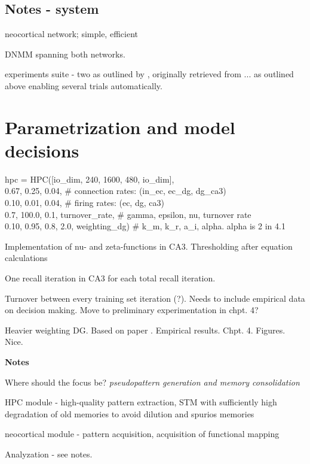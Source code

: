 \subsection*{Notes - system}

neocortical network; simple, efficient

DNMM spanning both networks.

experiments suite - two as outlined by \citep{Hattori2014}, originally retrieved from ... as outlined above
enabling several trials automatically.


\section{Parametrization and model decisions}

hpc = HPC([io\_dim, 240, 1600, 480, io\_dim], \\
          0.67, 0.25, 0.04,  \# connection rates: (in\_ec, ec\_dg, dg\_ca3) \\
          0.10, 0.01, 0.04,  \# firing rates: (ec, dg, ca3) \\
          0.7, 100.0, 0.1, turnover\_rate,  \# gamma, epsilon, nu, turnover rate \\
          0.10, 0.95, 0.8, 2.0, weighting\_dg)  \# k\_m, k\_r, a\_i, alpha. alpha is 2 in 4.1
          
Implementation of nu- and zeta-functions in CA3. Thresholding after equation calculations

One recall iteration in CA3 for each total recall iteration.

Turnover between every training set iteration (?). Needs to include empirical data on decision making. Move to preliminary experimentation in chpt. 4?

Heavier weighting DG. Based on paper \citep{Norman2003}. Empirical results. Chpt. 4. Figures. Nice.


\textbf{Notes}

Where should the focus be? \textit{pseudopattern generation and memory consolidation}

HPC module - high-quality pattern extraction, STM with sufficiently high degradation of old memories to avoid dilution and spurios memories

neocortical module - pattern acquisition, acquisition of functional mapping

Analyzation - see notes.
\\

